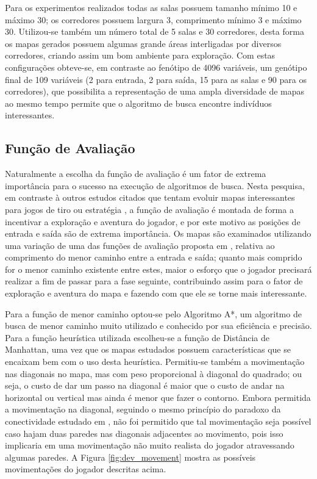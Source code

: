 Para os experimentos realizados todas as salas possuem tamanho mínimo 10 e máximo 30; os corredores possuem largura 3, comprimento mínimo 3 e máximo 30. Utilizou-se também um número total de 5 salas e 30 corredores, desta forma os mapas gerados possuem algumas grande áreas interligadas por diversos corredores, criando assim um bom ambiente para exploração. Com estas configurações obteve-se, em contraste ao fenótipo de 4096 variáveis, um genótipo final de 109 variáveis (2 para entrada, 2 para saída, 15 para as salas e 90 para os corredores), que possibilita a representação de uma ampla diversidade de mapas ao mesmo tempo permite que o algoritmo de busca encontre indivíduos interessantes.

\subsection{Função de Avaliação}

Naturalmente a escolha da função de avaliação é um fator de extrema importância para o sucesso na execução de algoritmos de busca. Nesta pesquisa, em contraste à outros estudos citados que tentam evoluir mapas interessantes para jogos de tiro \cite{cardamone2011evolving} \cite{lanzi2014evolving} ou estratégia \cite{liapis2013generating} \cite{liapis2013adaptive}, a função de avaliação é montada de forma a incentivar a exploração e aventura do jogador, e por este motivo as posições de entrada e saída são de extrema importância. Os mapas são examinados utilizando uma variação de uma das funções de avaliação proposta em \cite{ashlock2011search}, relativa ao comprimento do menor caminho entre a entrada e saída; quanto mais comprido for o menor caminho existente entre estes, maior o esforço que o jogador precisará realizar a fim de passar para a fase seguinte, contribuindo assim para o fator de exploração e aventura do mapa e fazendo com que ele se torne mais interessante.

Para a função de menor caminho optou-se pelo Algoritmo A*, um algoritmo de busca de menor caminho muito utilizado e conhecido por sua eficiência e precisão. Para a função heurística utilizada escolheu-se a função de Distância de Manhattan, uma vez que os mapas estudados possuem características que se encaixam bem com o uso desta heurística. Permitiu-se também a movimentação nas diagonais no mapa, mas com peso proporcional à diagonal do quadrado; ou seja, o custo de dar um passo na diagonal é maior que o custo de andar na horizontal ou vertical mas ainda é menor que fazer o contorno. Embora permitida a movimentação na diagonal, seguindo o mesmo princípio do paradoxo da conectividade estudado em \cite{resonfeld1966sequential}, não foi permitido que tal movimentação seja possível caso hajam duas paredes nas diagonais adjacentes ao movimento, pois isso implicaria em uma movimentação não muito realista do jogador atravessando algumas paredes. A Figura \ref{fig:dev_movement} mostra as possíveis movimentações do jogador descritas acima.

